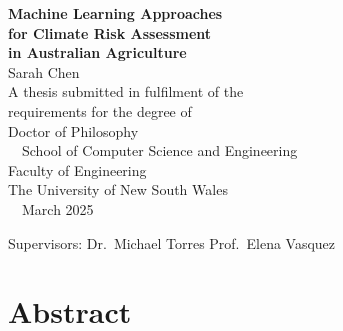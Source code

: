 \documentclass[12pt,a4paper]{report}
\begin{document}
\begin{titlepage}
\vspace*{3cm}
\begin{center}
{\Huge\bfseries\color{unswnavy}Machine Learning Approaches\\[8pt]
for Climate Risk Assessment\\[8pt]
in Australian Agriculture}\\[24pt]
{\LARGE\color{darkgray}Sarah Chen}\\[8pt]
{\large\color{darkgray}A thesis submitted in fulfilment of the\\[4pt]
requirements for the degree of\\[4pt]
Doctor of Philosophy}\\[24pt]
{\large\color{darkgray}\faUniversity~~School of Computer Science and Engineering\\[4pt]
Faculty of Engineering\\[4pt]
The University of New South Wales}\\[24pt]
{\large\color{darkgray}\faCalendar~~March 2025}
\end{center}
\vfill
\begin{center}
{\color{darkgray}\small Supervisors: Dr.\ Michael Torres \hspace{1.5cm} Prof.\ Elena Vasquez}
\end{center}
\end{titlepage}


\chapter*{Abstract}
\end{document}
